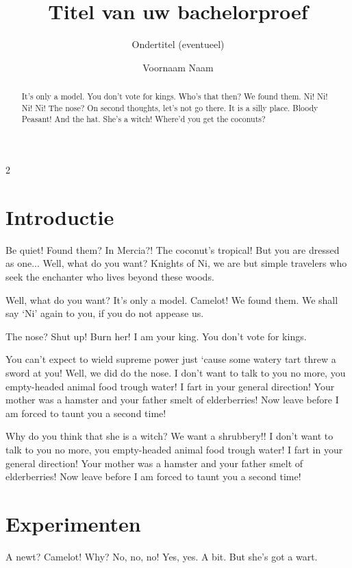 \documentclass[a0,portrait]{hogent-poster}
\title{Titel van uw bachelorproef}
\subtitle{Ondertitel (eventueel)}
\author{Voornaam Naam}
\begin{document}
\maketitle

\begin{abstract}
It's only a model.
You don't vote for kings. Who's that then? We found them. Ni! Ni! Ni! Ni!
The nose? On second thoughts, let's not go there. It is a silly place. Bloody Peasant! And the hat. She's a witch! Where'd you get the coconuts?
\end{abstract}

\begin{multicols}{2} %

\section{Introductie}

Be quiet! Found them? In Mercia?! The coconut's tropical! But you are dressed as one... Well, what do you want? Knights of Ni, we are but simple travelers who seek the enchanter who lives beyond these woods.

Well, what do you want? It's only a model. Camelot! We found them. We shall say `Ni' again to you, if you do not appease us.

The nose? Shut up! Burn her! I am your king. You don't vote for kings.

You can't expect to wield supreme power just `cause some watery tart threw a sword at you! Well, we did do the nose. I don't want to talk to you no more, you empty-headed animal food trough water! I fart in your general direction! Your mother was a hamster and your father smelt of elderberries! Now leave before I am forced to taunt you a second time!

Why do you think that she is a witch? We want a shrubbery!! I don't want to talk to you no more, you empty-headed animal food trough water! I fart in your general direction! Your mother was a hamster and your father smelt of elderberries! Now leave before I am forced to taunt you a second time!

\section{Experimenten}

A newt? Camelot! Why? No, no, no! Yes, yes. A bit. But she's got a wart.


\end{multicols}
\end{document}
